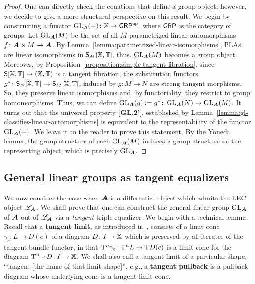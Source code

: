 \begin{proof}
One can directly check the equations that define a group object; however, we decide to give a more structural perspective on this result. We begin by constructing a functor $\GL_\A(-)\colon\X\to\Gr^\op$, where $\Gr$ is the category of groups. Let $\operatorname{GL}_{\bm{A}}(M)$ be the set of all $M$-parametrized linear automorphisms $f\colon{\bm{A}}\times M\to{\bm{A}}$. By Lemma~\ref{lemma:parametrized-linear-isomorphisms}, PLAs are linear isomorphisms in $\mathsf{S}_M[\mathbb{X},\mathbb{T}]$, thus, $\operatorname{GL}_{\bm{A}}(M)$ becomes a group object. Moreover, by Proposition~\ref{proposition:simple-tangent-fibration}, since $\mathsf{S}[\mathbb{X},\mathbb{T}]\to(\mathbb{X},\mathbb{T})$ is a tangent fibration, the substitution functors $g^\ast\colon\mathsf{S}_N[\mathbb{X},\mathbb{T}]\to\mathsf{S}_M[\mathbb{X},\mathbb{T}]$, induced by $g\colon M\to N$ are strong tangent morphisms. So, they preserve linear isomorphisms and, by functoriality, they restrict to group homomorphisms. Thus, we can define $\operatorname{GL}_{\bm{A}}(g)\mathrel{\mathop:}=g^\ast\colon\operatorname{GL}_{\bm{A}}(N)\to\operatorname{GL}_{\bm{A}}(M)$. It turns out that the universal property \textbf{[GL.2']}, established by Lemma~\ref{lemma:gl-classifies-linear-automorphisms} is equivalent to the representability of the functor $\operatorname{GL}_{\bm{A}}(-)$. We leave it to the reader to prove this statement. By the Yoneda lemma, the group structure of each $\operatorname{GL}_{\bm{A}}(M)$ induces a group structure on the representing object, which is precisely $\operatorname{GL}_{\bm{A}}$.
\end{proof}



\subsection{General linear groups as tangent equalizers}
\label{subsection:equalizers}
We now consider the case when ${\bm{A}}$ is a differential object which admits the LEC object $\mathscr{L}_{\bm{A}}$. We shall prove that one can construct the general linear group $\operatorname{GL}_{\bm{A}}$ of ${\bm{A}}$ out of $\mathscr{L}_{\bm{A}}$ via a \emph{tangent} triple equalizer. We begin with a technical lemma. Recall that a \textbf{tangent limit}, as introduced in~\cite[Definition~1.1.3]{macadam:vector-bundles}, consists of a limit cone $\gamma_c\colon L\to D(c)$ of a diagram $D\colon I\to\mathbb{X}$ which is preserved by all iterates of the tangent bundle functor, in that $\mathrm{T}^n\gamma_c\colon\mathrm{T}^nL\to\mathrm{T} D(c)$ is a limit cone for the diagram $\mathrm{T}^n\circ D\colon I\to\mathbb{X}$. We shall also call a tangent limit of a particular shape, ``tangent [the name of that limit shape]'', e.g., a \textbf{tangent pullback} is a pullback diagram whose underlying cone is a tangent limit cone.

